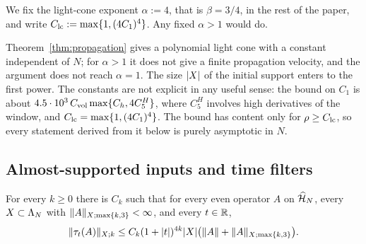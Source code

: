 We fix the light-cone exponent $\alpha:=4$, that is $\beta=3/4$, in the rest of the paper, and write
$C_{\rm lc}:=\max\{1,(4C_1)^4\}$. Any fixed $\alpha>1$ would do.

\begin{remark}\label{rem:propagation}
Theorem~\ref{thm:propagation} gives a polynomial light cone with a constant independent of $N$; for
$\alpha>1$ it does not give a finite propagation velocity, and the argument does not reach $\alpha=1$. The
size $\lvert X\rvert$ of the initial support enters to the first power. The constants are not explicit in any useful
sense: the bound on $C_1$ is about $4.5\cdot10^3\,C_{\mathrm{vol}}\max\{C_h,4C^H_5\}$, where $C^H_5$ involves high derivatives of
the window, and $C_{\rm lc}=\max\{1,(4C_1)^4\}$. The bound has content only for $\rho\ge C_{\rm lc}$, so every statement derived
from it below is purely asymptotic in $N$.
\end{remark}

\subsection{Almost-supported inputs and time filters}

\begin{lemma}\label{lem:almostinputs}
For every $k\ge0$ there is $C_k$ such that for every even operator $A$ on $\widehat{\mathcal{H}}_N$, every $X\subset\Lambda_N$ with
$\lVert A\rVert_{X;\max\{k,3\}}<\infty$, and every $t\in\mathbb{R}$,
\[
\lVert\tau_t(A)\rVert_{X;k}\le C_k(1+\lvert t\rvert)^{4k}\lvert X\rvert\bigl(\lVert A\rVert+\lVert A\rVert_{X;\max\{k,3\}}\bigr).
\]
\end{lemma}

